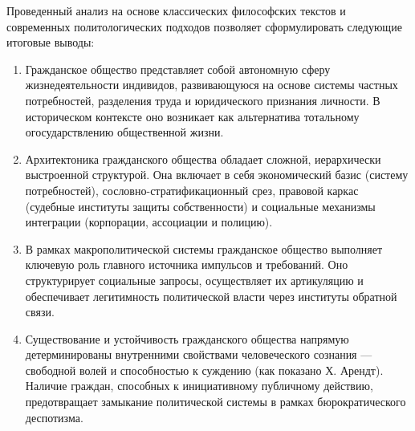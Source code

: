 Проведенный анализ на основе классических философских текстов и современных политологических подходов позволяет сформулировать следующие итоговые выводы:

\begin{enumerate}
    \item Гражданское общество представляет собой автономную сферу жизнедеятельности индивидов, развивающуюся на основе системы частных потребностей, разделения труда и юридического признания личности. В историческом контексте оно возникает как альтернатива тотальному огосударствлению общественной жизни.
    \item Архитектоника гражданского общества обладает сложной, иерархически выстроенной структурой. Она включает в себя экономический базис (систему потребностей), сословно-стратификационный срез, правовой каркас (судебные институты защиты собственности) и социальные механизмы интеграции (корпорации, ассоциации и полицию).
    \item В рамках макрополитической системы гражданское общество выполняет ключевую роль главного источника импульсов и требований. Оно структурирует социальные запросы, осуществляет их артикуляцию и обеспечивает легитимность политической власти через институты обратной связи.
    \item Существование и устойчивость гражданского общества напрямую детерминированы внутренними свойствами человеческого сознания — свободной волей и способностью к суждению (как показано Х. Арендт). Наличие граждан, способных к инициативному публичному действию, предотвращает замыкание политической системы в рамках бюрократического деспотизма.
\end{enumerate}